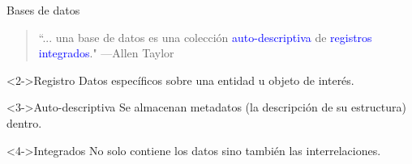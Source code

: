 \begin{frame}{Bases de datos}
    \begin{overlayarea}{\linewidth}{\textheight}
            \begin{block}{}
                \begin{quote}
                    ``... una base de datos es una colecci\'on \textcolor<3>{blue}{auto-descriptiva} de \textcolor<2>{blue}{registros} \textcolor<4>{blue}{integrados}."
                    \hspace{1em plus 1fill}---Allen Taylor
                \end{quote}
            \end{block}
                
    \begin{block}<2->{Registro}
        Datos espec\'ificos sobre una entidad u objeto de inter\'es.
    \end{block}

    \begin{block}<3->{Auto-descriptiva}
        Se almacenan metadatos (la descripci\'on de su estructura) dentro.
    \end{block}

    \begin{block}<4->{Integrados}
        No solo contiene los datos sino tambi\'en las interrelaciones.
    \end{block}
    \end{overlayarea}

    \pause
   
\end{frame}






